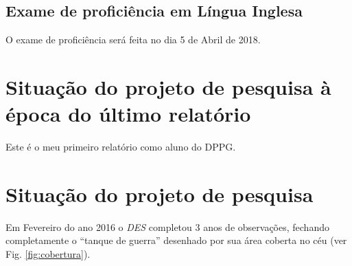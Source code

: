 \documentclass[a4paper, 11pt]{article}
\begin{document}
\subsection{Exame de profici\^encia em L\'ingua Inglesa}

O exame de proficiência será feita no dia 5 de Abril de 2018.

\section{Situação do projeto de pesquisa à época do último relatório}
Este é o meu primeiro relatório como aluno do DPPG.

\section{Situa\c{c}\~ao do projeto de pesquisa}

Em Fevereiro do ano 2016 o \textit{DES} completou 3 anos de observa\c{c}\~oes, fechando completamente o ``tanque de guerra'' desenhado por sua \'area coberta no c\'eu (ver Fig. \ref{fig:cobertura}).
\end{document}
